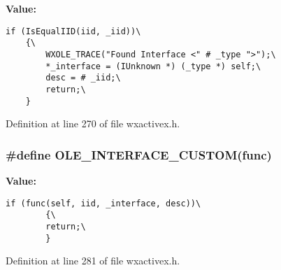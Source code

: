 {\bf Value:}

\footnotesize\begin{verbatim}if (IsEqualIID(iid, _iid))\
    {\
        WXOLE_TRACE("Found Interface <" # _type ">");\
        *_interface = (IUnknown *) (_type *) self;\
        desc = # _iid;\
        return;\
    }
\end{verbatim}\normalsize 


Definition at line 270 of file wxactivex.h.
\subsubsection{\setlength{\rightskip}{0pt plus 5cm}\#define OLE\_\-INTERFACE\_\-CUSTOM(func)}\label{wxactivex_8h_a8}


{\bf Value:}

\footnotesize\begin{verbatim}if (func(self, iid, _interface, desc))\
        {\
        return;\
        }
\end{verbatim}\normalsize 


Definition at line 281 of file wxactivex.h.
